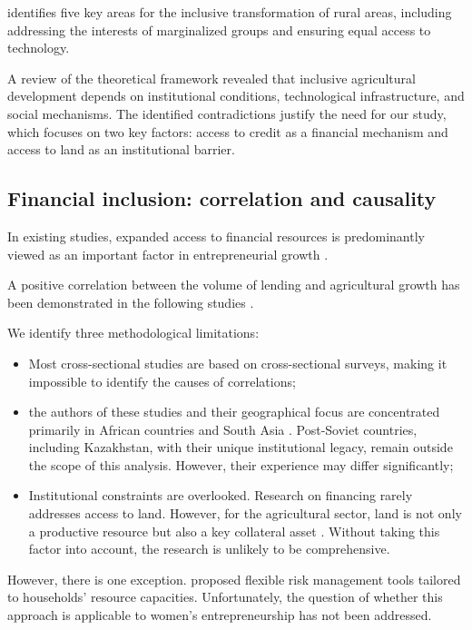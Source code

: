 ﻿\documentclass[pdflatex,sn-mathphys-ay]{sn-jnl}
\begin{document}
\citet{ref55} identifies five key areas for the inclusive
transformation of rural areas, including addressing the interests of
marginalized groups and ensuring equal access to technology.

A review of the theoretical framework revealed that inclusive
agricultural development depends on institutional conditions,
technological infrastructure, and social mechanisms. The identified
contradictions justify the need for our study, which focuses on two key
factors: access to credit as a financial mechanism and access to land as
an institutional barrier.

\subsection{Financial inclusion: correlation and causality}

In existing studies, expanded access to financial resources is
predominantly viewed as an important factor in entrepreneurial growth
\citep{ref103}.

A positive correlation between the volume of lending and agricultural
growth has been demonstrated in the following studies
\citep{ref94,ref99,ref70,ref49,ref95,ref97,ref61}.

We identify three methodological limitations:

\begin{itemize}
\item Most cross-sectional studies are based on cross-sectional
surveys, making it impossible to identify the causes of correlations;
\item the authors of these studies and their geographical focus are
concentrated primarily in African countries and South Asia
\citep{ref90,ref58,ref42,ref71,ref44,ref97,ref84}. Post-Soviet countries, including Kazakhstan, with their
unique institutional legacy, remain outside the scope of this analysis.
However, their experience may differ significantly;
\item Institutional constraints are overlooked. Research on financing
rarely addresses access to land. However, for the agricultural sector,
land is not only a productive resource but also a key collateral asset
\citep{ref20,ref06}. Without taking this factor into
account, the research is unlikely to be comprehensive.
\end{itemize}

However, there is one exception. \citet{ref18} proposed
flexible risk management tools tailored to households' resource
capacities. Unfortunately, the question of whether this approach is
applicable to women's entrepreneurship has not been addressed.
\end{document}
